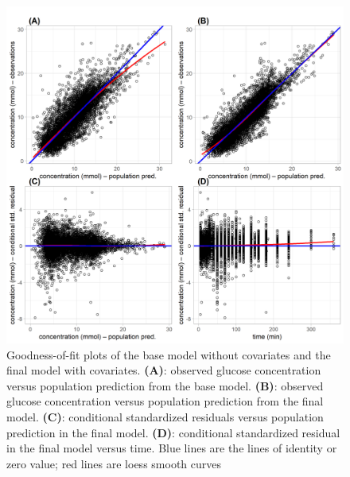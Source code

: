 \documentclass[utf8]{frontiersSCNS} %
\begin{document}
\begin{figure}[h!]
\begin{center}
\includegraphics[width=15cm]{fig2.PNG}
\end{center}
\caption{Goodness-of-fit plots of the base model without covariates and the final model with covariates. \textbf{(A)}: observed glucose concentration versus population prediction from the base model. \textbf{(B)}: observed glucose concentration versus population prediction from the final model. \textbf{(C)}: conditional standardized residuals versus population prediction in  the final model. \textbf{(D)}: conditional standardized residual in the final model versus time. Blue lines are the lines of identity or zero value; red lines are loess smooth curves}
\label{fig: fittings}
\end{figure}
\end{document}
